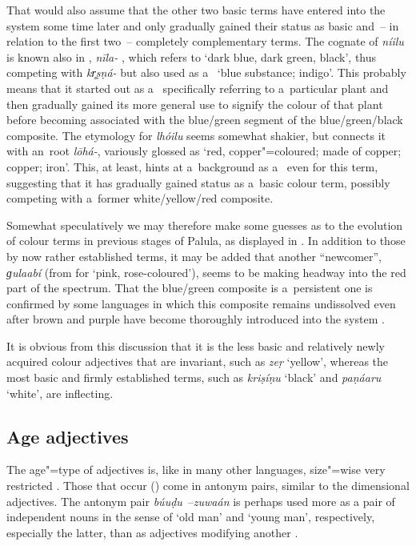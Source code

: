 That would also assume that the other two basic terms have entered into the system some time later
and only gradually gained their status as basic and~-- in relation to the first two~-- completely
complementary terms. The cognate of \textit{níilu} is known also in \iliOIA, \textit{nīla-}
\citep[7563]{turner1966}, which refers to `dark blue, dark green, black', thus competing with \iliOIA
\textit{kr̥ṣṇá-} but also used as a~ `blue substance; indigo'. This probably means that it
started out as a~ specifically referring to a~particular plant and then gradually gained its
more general use to signify the colour of that plant before becoming associated with the blue/green
segment of the blue/green/black composite. The etymology for \textit{lhóilu} seems somewhat shakier,
but \citet[11168, 11158]{turner1966} connects it with an~\iliOIA root \textit{lōhá-}, variously glossed
as `red, copper"=coloured; made of copper; copper; iron'. This, at least, hints at a~background as
a~ even for this term, suggesting that it has gradually gained status as a~basic colour term,
possibly competing with a~former white/yellow/red composite.



Somewhat speculatively we may therefore make some guesses as to the evolution of colour terms in previous stages of Palula, as displayed in . In addition to those by now rather established terms, it may be added that another ``newcomer'', \textit{ɡulaabí} (from \iliUrdu for `pink, rose-coloured'), seems to be making headway into the red part of the spectrum. That the blue/green composite is a~persistent one is confirmed by some languages in which this composite remains undissolved even after brown and purple have become thoroughly introduced into the system \citep[18]{kayetal1991}.



It is obvious from this discussion that it is the less basic and relatively newly acquired colour adjectives that are invariant, such as \textit{zeṛ} `yellow', whereas the most basic and firmly established terms, such as \textit{kriṣíṇu} `black' and \textit{paṇáaru} `white', are inflecting. 


\subsection{Age adjectives}
\label{subsec:6-2-3}


The age"=type of adjectives is, like in many other languages, size"=wise very restricted \citep[46]{dixon1982}. Those that occur () come in antonym pairs, similar to the dimensional adjectives. The antonym pair \textit{búuḍu}~--\textit{zuwaán} is perhaps used more as a pair of independent nouns in the sense of `old man' and `young man', respectively, especially the latter, than as adjectives modifying another . 


